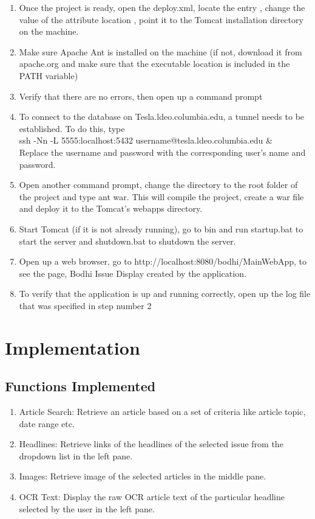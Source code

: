 \documentclass[amsart, 12pt]{article}
\begin{document}
\begin{enumerate}
\item Once the project is ready, open the deploy.xml, locate the entry , change the value of the attribute \textasciigrave location \textasciiacute, point it to the Tomcat installation directory on the machine.

\item Make sure Apache Ant is installed on the machine (if not, download it from apache.org and make sure that the executable location is included in the PATH variable)

\item Verify that there are no errors, then open up a command prompt

\item To connect to the database on Tesla.ldeo.columbia.edu, a tunnel needs to be established. To do this, type \\
ssh -Nn -L 5555:localhost:5432 username@tesla.ldeo.columbia.edu \& \\
Replace the username and password with the corresponding user's name and password.

\item Open another command prompt, change the directory to the root folder of  the project and type ant war. This will compile the project, create a war file and deploy it to the Tomcat's webapps directory.

\item Start Tomcat (if it is not already running), go to bin and run startup.bat to start the server and shutdown.bat to shutdown the server.

\item Open up a web browser, go to http://localhost:8080/bodhi/MainWebApp, to see the page, Bodhi Issue Display created by the application.

\item To verify that the application is up and running correctly, open up the log file that was specified in step number 2
\end{enumerate}


\section{Implementation}
\subsection{Functions Implemented}
\begin{enumerate}
\item Article Search: Retrieve an article based on a set of criteria like article topic, date range etc.
\item Headlines: Retrieve links of the headlines of the selected issue from the dropdown list in the left pane.
\item Images: Retrieve image of the selected articles in the middle pane.
\item OCR Text: Display the raw OCR article text of the particular headline selected by the user in the left pane.
\end{enumerate}
\end{document}
